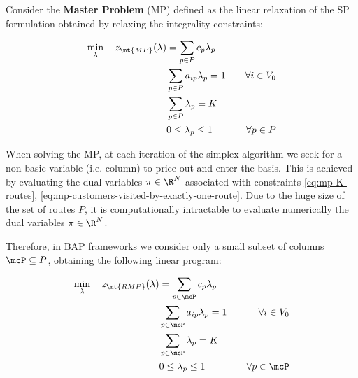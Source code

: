 Consider the \textbf{Master Problem} (MP) defined
as the linear relaxation of the SP formulation obtained by relaxing the integrality constraints:

\begin{align}
	\min_{\lambda} \quad z_\mt{MP}(\lambda) & = \sum_{p \in P}  c_p \lambda_p \label{eq:mp-obj-func}                                                                                                                             \\
	                                        & \sum_{p \in P}  a_{ip} \lambda_p = 1                   & \quad \forall i \in V_0                                              \label{eq:mp-customers-visited-by-exactly-one-route} \\
	                                        & \sum_{p \in P} \lambda_{p} = K\label{eq:mp-K-routes}                                                                                                                               \\
	                                        & 0 \le \lambda_p \le 1                                  & \quad \forall p \in P \label{eq:mp-lambda-mip-var-bounds}
\end{align}


When solving the MP,
at each iteration of the simplex algorithm we seek for a non-basic variable (i.e. column)
to price out and enter the basis.
This is achieved by evaluating the dual variables $\pi \in \R^{N}$
associated with constraints \eqref{eq:mp-K-routes}, \eqref{eq:mp-customers-visited-by-exactly-one-route}.
Due to the huge size of the set of routes $P$,
it is computationally intractable to evaluate numerically the dual variables $\pi \in \R^{N}$.

\medskip

Therefore, in BAP frameworks we consider only a small subset of columns $\mcP \subseteq P$,
obtaining the following linear program:

\begin{align}
	\min_{\lambda} \quad z_\mt{RMP}(\lambda) & = \sum_{p \in \mcP}  c_p \lambda_p \label{eq:rmp-obj-func}                                                                                                                              \\
	                                         & \sum_{p \in \mcP}  a_{ip} \lambda_p = 1                    & \quad \forall i \in V_0                                              \label{eq:rmp-customers-visited-by-exactly-one-route} \\
	                                         & \sum_{p \in \mcP} \lambda_{p} = K\label{eq:rmp-K-routes}                                                                                                                                \\
	                                         & 0 \le \lambda_p \le 1                                      & \quad \forall p \in \mcP \label{eq:rmp-lambda-mip-var-bounds}
\end{align}

